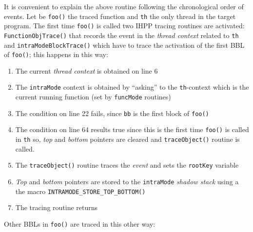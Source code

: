 \documentclass[a4paper,10pt]{report}
\begin{document}
\noindent
It is convenient to explain the above routine following the chronological
order of events. Let be \verb|foo()| the traced function and \verb|th| 
the only thread in the target program. The first time \verb|foo()| is called
two IHPP tracing routines are activated: \verb|FunctionObjTrace()| that
records the event in the \emph{thread context} related to \verb|th| and
\verb|intraModeBlockTrace()| which have to trace the activation of 
the first BBL of \verb|foo()|; this happens in this way:

\begin{enumerate}
\item The current \emph{thread context} is obtained on line 6
\item The \verb|intraMode| context is obtained by ``asking'' to 
the \verb|th|-context which is 
the current running function (set by \verb|funcMode| routines)
\item The condition on line 22 fails, since \verb|bb| is the first block of \verb|foo()|
\item The condition on line 64 results true since this is the first time
\verb|foo()| is called in \verb|th| so, \emph{top} and \emph{bottom}
pointers are cleared and \verb|traceObject()| routine is called.
\item The \verb|traceObject()| routine traces the \emph{event} and
sets the \verb|rootKey| variable
\item \emph{Top} and \emph{bottom} pointers are stored to the 
\verb|intraMode| \emph{shadow stack} using a the macro \verb|INTRAMODE_STORE_TOP_BOTTOM()|
\item The tracing routine returns
\end{enumerate}

\noindent
Other BBLs in \verb|foo()| are traced in this other way:
\end{document}
